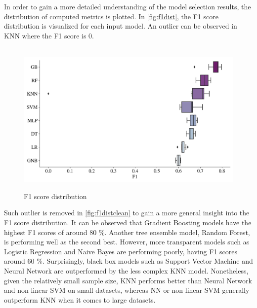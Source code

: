 In order to gain a more detailed understanding of the model selection results, the distribution of computed metrics is plotted. In \autoref{fig:f1dist}, the F1 score distribution is visualized for each input model. An outlier can be observed in KNN where the F1 score is 0.				
\begin{figure}[H]
\centering
\caption{F1 score distribution}\vspace{0.5em}
\label{fig:f1dist}\
\includegraphics[width=140mm]{Figures/F1_Distribution.jpg}
\vspace{-1em}
\end{figure}
Such outlier is removed in \autoref{fig:f1distclean} to gain a more general insight into the F1 score distribution.
It can be observed that Gradient Boosting models have the highest F1 scores of around 80 \%.
Another tree ensemble model, Random Forest, is performing well as the second best. However, more transparent models such as Logistic Regression and Naive Bayes are performing poorly, having F1 scores around 60 \%.
Surprisingly, black box models such as Support Vector Machine and Neural Network are outperformed by the less complex KNN model.
Nonetheless, given the relatively small sample size, KNN performs better than Neural Network and non-linear SVM on small datasets, whereas NN or non-linear SVM generally outperform KNN when it comes to large datasets.
